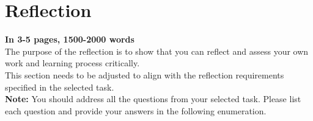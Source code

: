 \section{Reflection}
\label{sec:reflection}

\textbf{In 3-5 pages, 1500-2000 words}\\

The purpose of the reflection is to show that you can reflect and assess your own work and learning process critically.\\

This section needs to be adjusted to align with the reflection requirements specified in the selected task.\\

\textbf{Note:} You should address all the questions from your selected task. Please list each question and provide your answers in the following enumeration.\\

